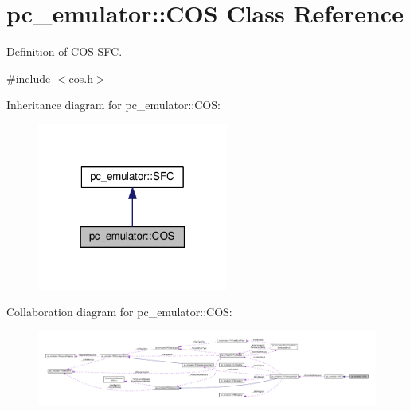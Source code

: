 \hypertarget{classpc__emulator_1_1COS}{}\section{pc\+\_\+emulator\+:\+:C\+OS Class Reference}
\label{classpc__emulator_1_1COS}


Definition of \hyperlink{classpc__emulator_1_1COS}{C\+OS} \hyperlink{classpc__emulator_1_1SFC}{S\+FC}.  




{\ttfamily \#include $<$cos.\+h$>$}



Inheritance diagram for pc\+\_\+emulator\+:\+:C\+OS\+:\nopagebreak
\begin{figure}[H]
\begin{center}
\leavevmode
\includegraphics[width=178pt]{classpc__emulator_1_1COS__inherit__graph}
\end{center}
\end{figure}


Collaboration diagram for pc\+\_\+emulator\+:\+:C\+OS\+:\nopagebreak
\begin{figure}[H]
\begin{center}
\leavevmode
\includegraphics[width=350pt]{classpc__emulator_1_1COS__coll__graph}
\end{center}
\end{figure}
